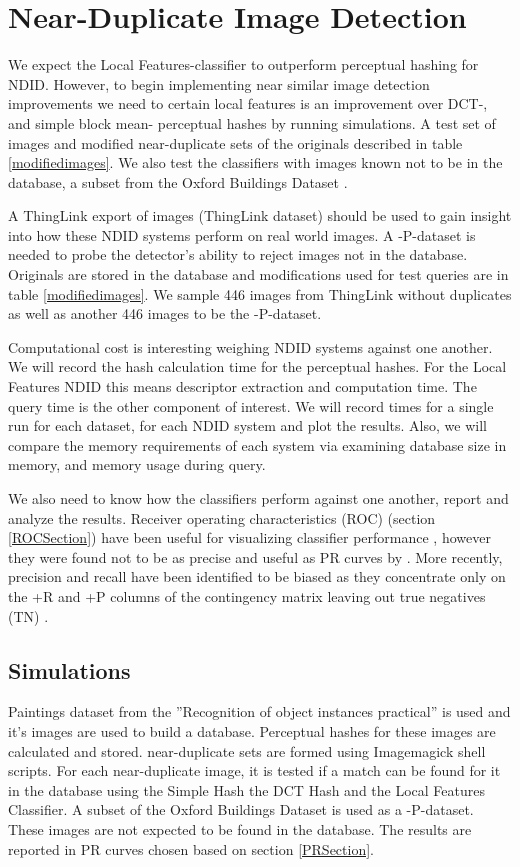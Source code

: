 \documentclass[english,12pt,a4paper,pdftex,elec,utf8, table]{aaltothesis}
\begin{document}
\clearpage

\section{Near-Duplicate Image Detection} \label{NDID}
We expect the Local Features-classifier to outperform perceptual hashing for NDID. However, to begin implementing near similar image detection improvements we need to certain local features is an improvement over DCT-, and simple block mean- perceptual hashes by running simulations. A test set of images and modified near-duplicate sets of the originals described in table \ref{modifiedimages}. We also test the classifiers with images known not to be in the database, a subset from the Oxford Buildings Dataset \cite{PhilbinJamesArandjelovicReljaZisserman2012}.

A ThingLink export of images (ThingLink dataset) should be used to gain insight into how these NDID systems perform on real world images. A -P-dataset is needed to probe the detector's ability to reject images not in the database. Originals are stored in the database and modifications used for test queries are in table \ref{modifiedimages}. We sample 446 images from ThingLink without duplicates as well as another 446 images to be the -P-dataset.

Computational cost is interesting weighing NDID systems against one another. We will record the hash calculation time for the perceptual hashes. For the Local Features NDID this means descriptor extraction and computation time. The query time is the other component of interest. We will record times for a single run for each dataset, for each NDID system and plot the results. Also, we will compare the memory requirements of each system via examining database size in memory, and memory usage during query.

We also need to know how the classifiers perform against one another, report and analyze the results. Receiver operating characteristics (ROC) (section \ref{ROCSection}) have been useful for visualizing classifier performance \cite{Fawcett2006}, however they were found not to be as precise and useful as PR curves by \cite{Davis2006}. More recently, precision and recall have been identified to be biased as they concentrate only on the +R and +P columns of the contingency matrix leaving out true negatives (TN) \cite{POWERS2011}.

\subsection{Simulations}
Paintings dataset from the ''Recognition of object instances practical'' \cite{Vedaldi2012} is used and it's images are used to build a database. Perceptual hashes for these images are calculated and stored. near-duplicate sets are formed using Imagemagick shell scripts. For each near-duplicate image, it is tested if a match can be found for it in the database using the Simple Hash the DCT Hash and the Local Features Classifier. A subset of the Oxford Buildings Dataset \cite{PhilbinJamesArandjelovicReljaZisserman2012} is used as a -P-dataset. These images are not expected to be found in the database. The results are reported in PR curves chosen based on section \ref{PRSection}.
\end{document}
